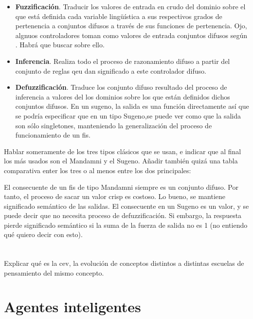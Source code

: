\begin{itemize}
	\item \textbf{Fuzzificación}. Traducir los valores de entrada en crudo del dominio sobre el que está definida cada variable lingüística a sus respectivos grados de pertenencia a conjuntos difusos a través de sus funciones de pertenencia. \TODO Ojo, algnuos controladores toman como valores de entrada conjuntos difusos según \cite{Ma}. Habrá que buscar sobre ello.
	\item \textbf{Inferencia}. Realiza todo el proceso de razonamiento difuso a partir del conjunto de reglas qeu dan significado a este controlador difuso.
	\item \textbf{Defuzzificación}. Traduce los conjunto difuso resultado del proceso de inferencia a valores del los dominios sobre los que están definidos dichos conjuntos difusos. \TODO En un sugeno, la salida es una función directamente así que se podría especificar que en un tipo Sugeno,se puede ver como que la salida son sólo singletones, manteniendo la generalización del proceso de funcionamiento de un \ac{fis}.
\end{itemize}

Hablar someramente de los tres tipos clásicos que se usan, e indicar que al final los más usados son el Mandamni y el Sugeno. Añadir también quizá una tabla comparativa enter los tres o al menos entre los dos principales:

El consecuente de un \ac{fis} de tipo Mandamni siempre es un conjunto difuso. Por tanto, el proceso de sacar un valor crisp es costoso. Lo bueno, se mantiene significado semántico de las salidas. El consecuente en un Sugeno es un valor, y se puede decir que no necesita proceso de defuzzificación. Si embargo, la respuesta pierde significado semántico si la suma de la fuerza de salida no es 1 (no entiendo qué quiero decir con esto).

\section{}

Explicar qué es la cev, la evolución de conceptos distintos a distintas escuelas de pensamiento del mismo concepto.

\section{Agentes inteligentes}
\label{ch:ci:s:agent-concept}

